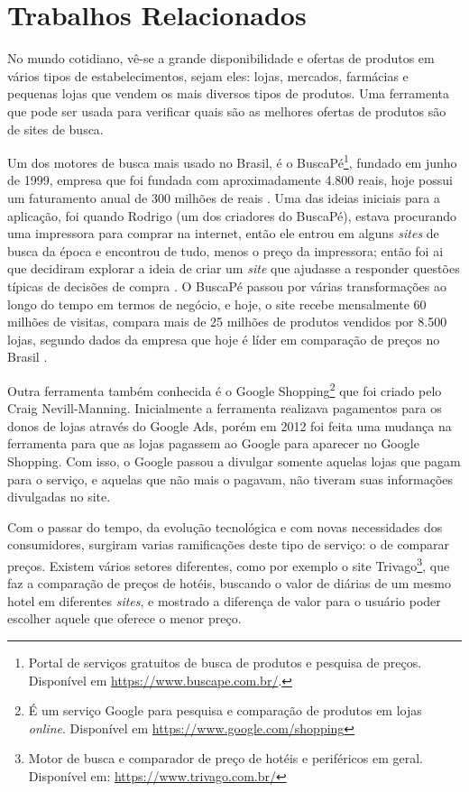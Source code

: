 \section{Trabalhos Relacionados}
\label{sec:trabalhos-relacionados}

No mundo cotidiano, vê-se a grande disponibilidade e ofertas de produtos em vários tipos de estabelecimentos, sejam eles: lojas, mercados, farmácias e pequenas lojas que vendem os mais diversos tipos de produtos. Uma ferramenta que pode ser usada para verificar quais são as melhores ofertas de produtos são de sites de busca.

Um dos motores de busca mais usado no Brasil, é o BuscaPé\footnote{Portal de serviços gratuitos de busca de produtos e pesquisa de preços. Disponível em \url{https://www.buscape.com.br/}.}, fundado em junho de 1999, empresa que foi fundada com aproximadamente 4.800 reais, hoje possui um faturamento anual de 300 milhões de reais \cite{EmídiaFelipe2017BUSCAPÉ}. Uma das ideias iniciais para a aplicação, foi quando Rodrigo (um dos criadores do BuscaPé), estava procurando uma impressora para comprar na internet, então ele entrou em alguns \textit{sites} de busca da época e encontrou de tudo, menos o preço da impressora; então foi ai que decidiram explorar a ideia de criar um \textit{site} que ajudasse a responder questões típicas de decisões de compra \cite{Arruda2011BuscaPé}. O BuscaPé passou por várias transformações ao longo do tempo em termos de negócio, e hoje, o site recebe mensalmente 60 milhões de visitas, compara mais de 25 milhões de produtos vendidos por 8.500 lojas, segundo dados da empresa que hoje é líder em comparação de preços no Brasil \cite{HELOÍSA2017Startups}.

Outra ferramenta também conhecida é o Google Shopping\footnote{É um serviço Google para pesquisa e comparação de produtos em lojas \textit{online}. Disponível em \url{https://www.google.com/shopping}} que foi criado pelo Craig Nevill-Manning. Inicialmente a ferramenta realizava pagamentos para os donos de lojas através do Google Ads, porém em 2012 foi feita uma mudança na ferramenta para que as lojas pagassem ao Google para aparecer no Google Shopping. Com isso, o Google passou a divulgar somente aquelas lojas que pagam para o serviço, e aquelas que não mais o pagavam, não tiveram suas informações divulgadas no site.

Com o passar do tempo, da evolução tecnológica e com novas necessidades dos consumidores, surgiram varias ramificações deste tipo de serviço: o de comparar preços. Existem vários setores diferentes, como por exemplo o site Trivago\footnote{Motor de busca e comparador de preço de hotéis e periféricos em geral. Disponível em: \url{https://www.trivago.com.br/}}, que faz a comparação de preços de hotéis, buscando o valor de diárias de um mesmo hotel em diferentes \textit{sites}, e mostrado a diferença de valor para o usuário poder escolher aquele que oferece o menor preço.

